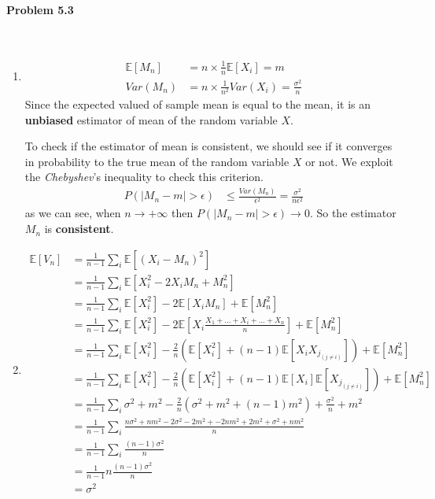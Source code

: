 \documentclass[12pt, letterpaper]{scrartcl}
\begin{document}
\paragraph*{Problem 5.3} \hfill\\

\begin{enumerate}[((a))]
    \item 
    \begin{align*}
        \mathbb{E}[M_n]&=n\times\frac{1}{n}\mathbb{E}[X_i]=m\\
        Var(M_n)&=n\times\frac{1}{n^2} Var(X_i)=\frac{\sigma^2}{n}
    \end{align*}
    Since the expected valued of sample mean is equal to the mean, it is an \textbf{unbiased} estimator of mean of the random variable $X$.

    To check if the estimator of mean is consistent, we should see if it converges in probability to the true mean of the random variable $X$ or not. We exploit the \emph{Chebyshev}'s inequality to check this criterion.
    \begin{align*}
        P(|M_n-m|>\epsilon)&\leq\frac{Var(M_n)}{\epsilon^2}=\frac{\sigma^2}{n\epsilon^2}
    \end{align*}
    as we can see, when $n\rightarrow+\infty$ then $P(|M_n-m|>\epsilon)\rightarrow0$. So the estimator $M_n$ is \textbf{consistent}.
    \item
    \begin{align*}
        \mathbb{E}[V_n]&=\frac{1}{n-1}\sum_i\mathbb{E}[(X_i-M_n)^2]\\
        &=\frac{1}{n-1}\sum_i\mathbb{E}[X_i^2-2X_iM_n+M_n^2]\\
        &=\frac{1}{n-1}\sum_i\mathbb{E}[X_i^2]-2\mathbb{E}[X_iM_n]+\mathbb{E}[M_n^2]\\
        &=\frac{1}{n-1}\sum_i\mathbb{E}[X_i^2]-2\mathbb{E}[X_i\frac{X_1+\dots+X_i+\dots+X_n}{n}]+\mathbb{E}[M_n^2]\\
        &=\frac{1}{n-1}\sum_i\mathbb{E}[X_i^2]-\frac{2}{n}(\mathbb{E}[X_i^2] + (n-1)\mathbb{E}[X_iX_{j_{(j\neq i)}}])+\mathbb{E}[M_n^2]\\
        &=\frac{1}{n-1}\sum_i\mathbb{E}[X_i^2]-\frac{2}{n}(\mathbb{E}[X_i^2] + (n-1)\mathbb{E}[X_i]\mathbb{E}[X_{j_{(j\neq i)}}])+\mathbb{E}[M_n^2]\\
        &=\frac{1}{n-1}\sum_i\sigma^2+m^2-\frac{2}{n}(\sigma^2+m^2 + (n-1)m^2)+\frac{\sigma^2}{n}+m^2\\
        &=\frac{1}{n-1}\sum_i\frac{n\sigma^2+nm^2-2\sigma^2-2m^2+-2nm^2+2m^2+\sigma^2+nm^2}{n}\\
        &=\frac{1}{n-1}\sum_i\frac{(n-1)\sigma^2}{n}\\
        &=\frac{1}{n-1}n\frac{(n-1)\sigma^2}{n}\\
        &=\sigma^2
    \end{align*}
    

\end{enumerate}
\end{document}
